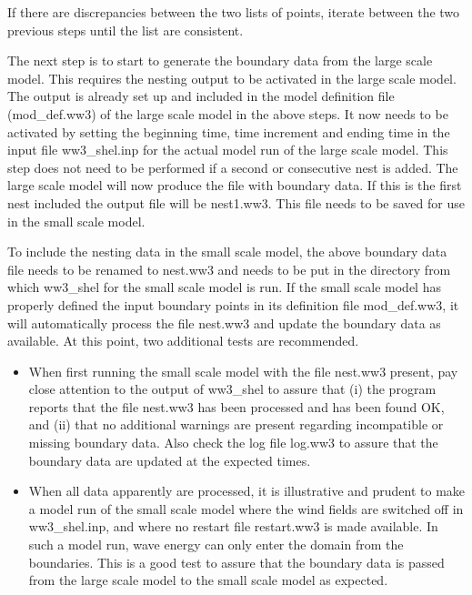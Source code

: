 \begin{list}{)}{
             \rightmargin 5mm 
              \leftmargin 10mm}
\item If there are discrepancies between the two lists of points, iterate
      between the two previous steps until the list are consistent.

\item The next step is to start to generate the boundary data from the large
      scale model. This requires the nesting output to be activated in the
      large scale model. The output is already set up and included in the
      model definition file ({\file mod\_def.ww3}) of the large scale model in
      the above steps. It now needs to be activated by setting the beginning
      time, time increment and ending time in the input file {\file
      ww3\_shel.inp} for the actual model run of the large scale model. This
      step does not need to be performed if a second or consecutive nest is
      added. The large scale model will now produce the file with boundary
      data. If this is the first nest included the output file will be {\file
      nest1.ww3}. This file needs to be saved for use in the small scale
      model.

\item To include the nesting data in the small scale model, the above boundary
      data file needs to be renamed to {\file nest.ww3} and needs to be put in
      the directory from which {\file ww3\_shel} for the small scale model is
      run. If the small scale model has properly defined the input boundary
      points in its definition file {\file mod\_def.ww3}, it will
      automatically process the file {\file nest.ww3} and update the boundary
      data as available. At this point, two additional tests are recommended.

\begin{itemize}

\item When first running the small scale model with the file {\file nest.ww3}
      present, pay close attention to the output of {\code ww3\_shel} to
      assure that (i) the program reports that the file {\file nest.ww3} has
      been processed and has been found OK, and (ii) that no additional
      warnings are present regarding incompatible or missing boundary
      data. Also check the log file {\file log.ww3} to assure that the
      boundary data are updated at the expected times.

\item When all data apparently are processed, it is illustrative and prudent to
      make a model run of the small scale model where the wind fields are
      switched off in {\file ww3\_shel.inp}, and where no restart file {\file
      restart.ww3} is made available. In such a model run, wave energy can
      only enter the domain from the boundaries. This is a good test to assure
      that the boundary data is passed from the large scale model to the small
      scale model as expected.

\end{itemize}

\end{list}

